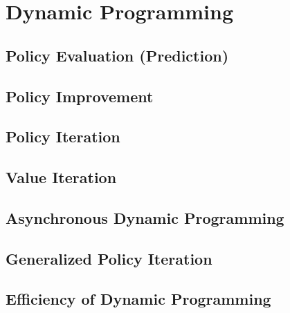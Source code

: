 \section{Dynamic Programming}

\subsection{Policy Evaluation (Prediction)}

\subsection{Policy Improvement}

\subsection{Policy Iteration}

\subsection{Value Iteration}

\subsection{Asynchronous Dynamic Programming}

\subsection{Generalized Policy Iteration}

\subsection{Efficiency of Dynamic Programming}